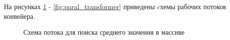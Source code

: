 \newpage
На рисунках \ref{fig:paral_mean} - \ref{fig:paral_transformer} приведены cхемы рабочих потоков конвейера.


\begin{figure}[h!]
	
	
	\caption{Схема потока для поиска среднего значения в массиве}
	
	\label{fig:paral_mean}
	
\end{figure}

